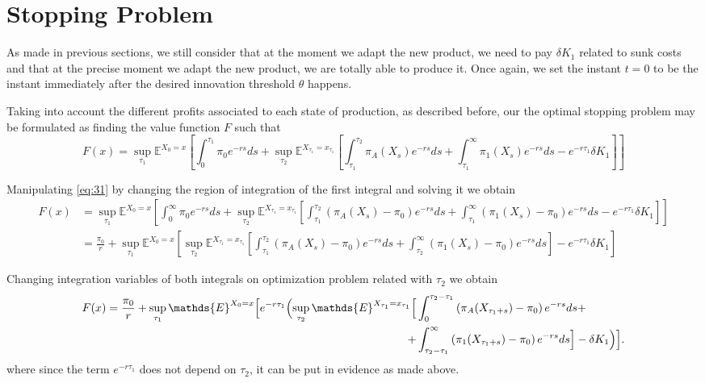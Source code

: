 \section{Stopping Problem}
\label{section:2_theory}



As made in previous sections, we still consider that at the moment we adapt the new product, we need to pay $\delta K_1$ related to sunk costs and that at the precise moment we adapt the new product, we are totally able to produce it. Once again, we set the instant $t=0$ to be the instant immediately after the desired innovation threshold $\theta$ happens.

Taking into account the different profits associated to each state of production, as described before, our the optimal stopping problem may be formulated as finding the value function $F$ such that
\begin{equation}
F(x)=\sup _{\tau_1} \mathds{E}^{X_0=x} \left[ \int_0^{\tau_1} \pi_0e^{-rs} ds + \sup_{\tau_2} \mathds{E}^{X_{\tau_1}=x_{\tau_1}} \left[ \int_{\tau_1}^{\tau_2}  \pi_A(X_s) e^{-rs}ds + \int_{\tau_1}^\infty \pi_1(X_s)e^{-rs}ds -e^{-r \tau_1}\delta K_1  \right] \right]
\label{eq:31}
\end{equation}

Manipulating \eqref{eq:31} by changing the region of integration of the first integral and solving it we obtain
\begin{align}
F(x)&=\sup _{\tau_1} \mathds{E}^{X_0=x} \left[ \int_0^{\infty} \pi_0e^{-rs} ds +\sup_{\tau_2} \mathds{E}^{X_{\tau_1}=x_{\tau_1}} \left[ \int_{\tau_1}^{\tau_2} \left( \pi_A(X_s)-\pi_0 \right) e^{-rs}ds + \int_{\tau_1}^\infty \left( \pi_1(X_s)-\pi_0 \right) e^{-rs}ds -e^{-r \tau_1}\delta K_1  \right] \right] \nonumber \\
&=\frac{\pi_0}{r}+\sup _{\tau_1} \mathds{E}^{X_0=x} \left[  \sup_{\tau_2} \mathds{E}^{X_{\tau_1}=x_{\tau_1}} \left[ \int_{\tau_1}^{\tau_2} \left( \pi_A(X_s)-\pi_0 \right) e^{-rs}ds + \int_{\tau_2}^\infty \left( \pi_1(X_s)-\pi_0 \right) e^{-rs}ds  \right]-e^{-r \tau_1}\delta K_1 \right]
\label{eq:32}
\end{align}

Changing integration variables of both integrals on optimization problem related with $\tau_2$ we obtain
\begin{equation}
	\begin{split}
		F(x)=\frac{\pi_0}{r}+\sup _{\tau_1} \mathds{E}^{X_0=x} \Bigl[ e^{-r \tau_1} \Bigl(  \sup_{\tau_2} \mathds{E}^{X_{\tau_1}=x_{\tau_1}} \Bigl[ &\int_0^{\tau_2-\tau_1} \left( \pi_A(X_{\tau_1+s})-\pi_0 \right) e^{-rs}ds +\\
		+&\int_{\tau_2-\tau_1}^\infty \left( \pi_1(X_{\tau_1+s})-\pi_0 \right) e^{-rs}ds  \Bigr]-\delta K_1 \Bigr) \Bigr].
	\end{split}
	\label{eq:3w}
\end{equation}
where since the term $e^{-r \tau_1}$ does not depend on $\tau_2$, it can be put in evidence as made above.


